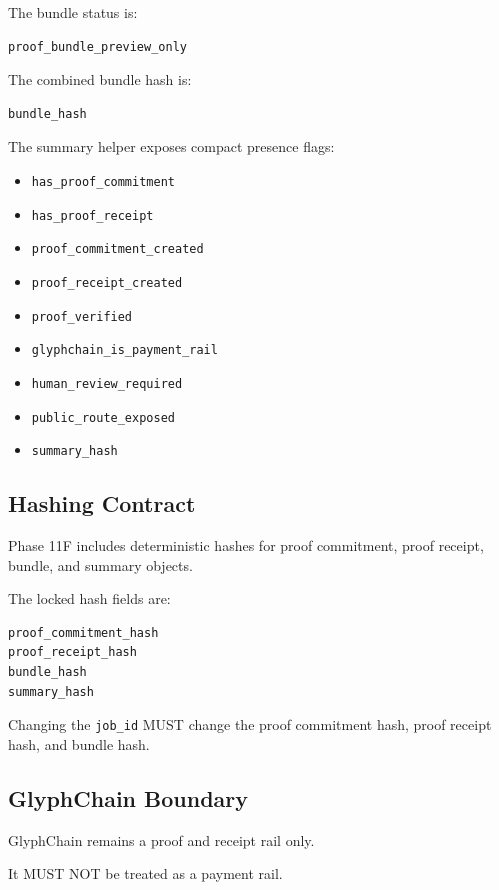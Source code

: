 The bundle status is:

\begin{verbatim}
proof_bundle_preview_only
\end{verbatim}

The combined bundle hash is:

\begin{verbatim}
bundle_hash
\end{verbatim}

The summary helper exposes compact presence flags:

\begin{itemize}
  \item \texttt{has\_proof\_commitment}
  \item \texttt{has\_proof\_receipt}
  \item \texttt{proof\_commitment\_created}
  \item \texttt{proof\_receipt\_created}
  \item \texttt{proof\_verified}
  \item \texttt{glyphchain\_is\_payment\_rail}
  \item \texttt{human\_review\_required}
  \item \texttt{public\_route\_exposed}
  \item \texttt{summary\_hash}
\end{itemize}

\subsection{Hashing Contract}

Phase 11F includes deterministic hashes for proof commitment, proof receipt, bundle, and summary objects.

The locked hash fields are:

\begin{verbatim}
proof_commitment_hash
proof_receipt_hash
bundle_hash
summary_hash
\end{verbatim}

Changing the \texttt{job\_id} MUST change the proof commitment hash, proof receipt hash, and bundle hash.

\subsection{GlyphChain Boundary}

GlyphChain remains a proof and receipt rail only.

It MUST NOT be treated as a payment rail.

